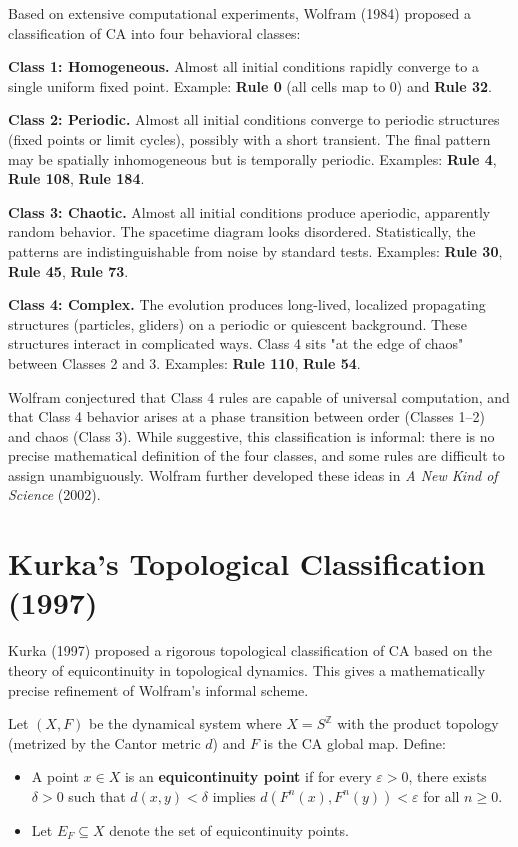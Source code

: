Based on extensive computational experiments, Wolfram (1984) proposed a classification of CA into four behavioral classes:

\textbf{Class 1: Homogeneous.} Almost all initial conditions rapidly converge to a single uniform fixed point. Example: \textbf{Rule 0} (all cells map to 0) and \textbf{Rule 32}.

\textbf{Class 2: Periodic.} Almost all initial conditions converge to periodic structures (fixed points or limit cycles), possibly with a short transient. The final pattern may be spatially inhomogeneous but is temporally periodic. Examples: \textbf{Rule 4}, \textbf{Rule 108}, \textbf{Rule 184}.

\textbf{Class 3: Chaotic.} Almost all initial conditions produce aperiodic, apparently random behavior. The spacetime diagram looks disordered. Statistically, the patterns are indistinguishable from noise by standard tests. Examples: \textbf{Rule 30}, \textbf{Rule 45}, \textbf{Rule 73}.

\textbf{Class 4: Complex.} The evolution produces long-lived, localized propagating structures (particles, gliders) on a periodic or quiescent background. These structures interact in complicated ways. Class 4 sits "at the edge of chaos" between Classes 2 and 3. Examples: \textbf{Rule 110}, \textbf{Rule 54}.

Wolfram conjectured that Class 4 rules are capable of universal computation, and that Class 4 behavior arises at a phase transition between order (Classes 1--2) and chaos (Class 3). While suggestive, this classification is informal: there is no precise mathematical definition of the four classes, and some rules are difficult to assign unambiguously. Wolfram further developed these ideas in \textit{A New Kind of Science} (2002).


\section{Kurka's Topological Classification (1997)}

Kurka (1997) proposed a rigorous topological classification of CA based on the theory of equicontinuity in topological dynamics. This gives a mathematically precise refinement of Wolfram's informal scheme.

Let $(X, F)$ be the dynamical system where $X = S^{\mathbb{Z}}$ with the product topology (metrized by the Cantor metric $d$) and $F$ is the CA global map. Define:

\begin{itemize}
\item A point $x \in X$ is an \textbf{equicontinuity point} if for every $\varepsilon > 0$, there exists $\delta > 0$ such that $d(x, y) < \delta$ implies $d(F^n(x), F^n(y)) < \varepsilon$ for all $n \geq 0$.
\item Let $E_F \subseteq X$ denote the set of equicontinuity points.
\end{itemize}

